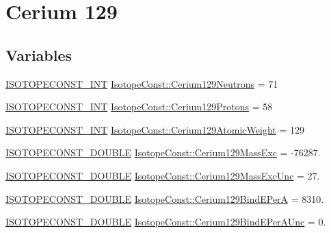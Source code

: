\hypertarget{group___isotope_const-_cerium-_ce129}{}\section{Cerium 129}
\label{group___isotope_const-_cerium-_ce129}
\subsection*{Variables}
\begin{DoxyCompactItemize}
\item 
\mbox{\hyperlink{group___isotope_const-_macros_ga5f18360b3e99483a35c32d789e62621c}{I\+S\+O\+T\+O\+P\+E\+C\+O\+N\+S\+T\+\_\+\+I\+NT}} \mbox{\hyperlink{group___isotope_const-_cerium-_ce129_ga0bc7b1454dd5e71fe6939203cef299ac}{Isotope\+Const\+::\+Cerium129\+Neutrons}} = 71
\item 
\mbox{\hyperlink{group___isotope_const-_macros_ga5f18360b3e99483a35c32d789e62621c}{I\+S\+O\+T\+O\+P\+E\+C\+O\+N\+S\+T\+\_\+\+I\+NT}} \mbox{\hyperlink{group___isotope_const-_cerium-_ce129_gaa2e6cb60ed5b2c5f39e6c04f8f272bc5}{Isotope\+Const\+::\+Cerium129\+Protons}} = 58
\item 
\mbox{\hyperlink{group___isotope_const-_macros_ga5f18360b3e99483a35c32d789e62621c}{I\+S\+O\+T\+O\+P\+E\+C\+O\+N\+S\+T\+\_\+\+I\+NT}} \mbox{\hyperlink{group___isotope_const-_cerium-_ce129_ga8aa462ec2c97b78303dde9a27692f708}{Isotope\+Const\+::\+Cerium129\+Atomic\+Weight}} = 129
\item 
\mbox{\hyperlink{group___isotope_const-_macros_ga8f45a7272ce02c0b4c65c44636ed719a}{I\+S\+O\+T\+O\+P\+E\+C\+O\+N\+S\+T\+\_\+\+D\+O\+U\+B\+LE}} \mbox{\hyperlink{group___isotope_const-_cerium-_ce129_ga3a73e694f37c5bb8e4539a484dbf5592}{Isotope\+Const\+::\+Cerium129\+Mass\+Exc}} = -\/76287.
\item 
\mbox{\hyperlink{group___isotope_const-_macros_ga8f45a7272ce02c0b4c65c44636ed719a}{I\+S\+O\+T\+O\+P\+E\+C\+O\+N\+S\+T\+\_\+\+D\+O\+U\+B\+LE}} \mbox{\hyperlink{group___isotope_const-_cerium-_ce129_ga3bba9c481c338a48b342392562c689fa}{Isotope\+Const\+::\+Cerium129\+Mass\+Exc\+Unc}} = 27.
\item 
\mbox{\hyperlink{group___isotope_const-_macros_ga8f45a7272ce02c0b4c65c44636ed719a}{I\+S\+O\+T\+O\+P\+E\+C\+O\+N\+S\+T\+\_\+\+D\+O\+U\+B\+LE}} \mbox{\hyperlink{group___isotope_const-_cerium-_ce129_ga03da9232ce08668b4e27d990b9cae39d}{Isotope\+Const\+::\+Cerium129\+Bind\+E\+PerA}} = 8310.
\item 
\mbox{\hyperlink{group___isotope_const-_macros_ga8f45a7272ce02c0b4c65c44636ed719a}{I\+S\+O\+T\+O\+P\+E\+C\+O\+N\+S\+T\+\_\+\+D\+O\+U\+B\+LE}} \mbox{\hyperlink{group___isotope_const-_cerium-_ce129_gad65ee14b4a590990c210962ada8b0fa1}{Isotope\+Const\+::\+Cerium129\+Bind\+E\+Per\+A\+Unc}} = 0.

\end{DoxyCompactItemize}
